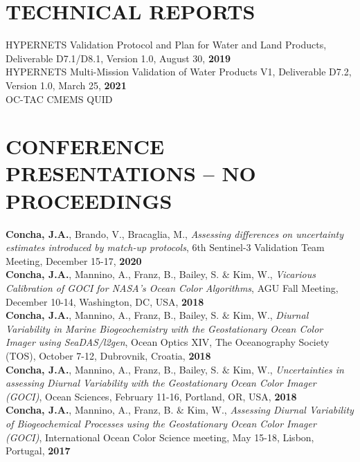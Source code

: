 \documentclass[11pt]{res}
\begin{document}
\begin{resume}
\section{TECHNICAL REPORTS}
\vspace{0.1in}
HYPERNETS Validation Protocol and Plan for Water and Land Products, Deliverable D7.1/D8.1, Version 1.0, August 30, {\bf 2019}
\vspace{0.1in}\\
HYPERNETS Multi-Mission Validation of Water Products V1, Deliverable D7.2, Version 1.0, March 25, {\bf 2021}
\vspace{0.1in}\\
OC-TAC CMEMS QUID
\section{CONFERENCE PRESENTATIONS -- NO PROCEEDINGS}
\vspace{0.1in}
{\bf Concha, J.A.}, Brando, V., Bracaglia, M., {\it Assessing differences on uncertainty estimates introduced by match-up protocols}, 6th Sentinel-3 Validation Team Meeting, December 15-17, {\bf 2020}
\vspace{0.1in}\\
{\bf Concha, J.A.}, Mannino, A., Franz, B., Bailey, S. $\&$ Kim, W., {\it Vicarious Calibration of GOCI for NASA’s Ocean Color Algorithms}, AGU Fall Meeting, December 10-14, Washington, DC, USA, {\bf 2018}
\vspace{0.1in}\\
{\bf Concha, J.A.}, Mannino, A., Franz, B., Bailey, S. $\&$ Kim, W., {\it Diurnal Variability in Marine Biogeochemistry with the Geostationary Ocean Color Imager using SeaDAS/l2gen}, Ocean Optics XIV, The Oceanography Society (TOS), October 7-12, Dubrovnik, Croatia, {\bf 2018}
\vspace{0.1in}\\
{\bf Concha, J.A.}, Mannino, A., Franz, B., Bailey, S. $\&$ Kim, W., {\it Uncertainties in assessing Diurnal Variability with the Geostationary Ocean Color Imager (GOCI)}, Ocean Sciences, February 11-16, Portland, OR, USA, {\bf 2018}
\vspace{0.1in}\\
{\bf Concha, J.A.}, Mannino, A., Franz, B. $\&$ Kim, W., {\it Assessing Diurnal Variability of Biogeochemical Processes using the Geostationary Ocean Color Imager (GOCI)}, International Ocean Color Science meeting, May 15-18, Lisbon, Portugal, {\bf 2017}
\vspace{0.1in}\\

\end{resume}
\end{document}
